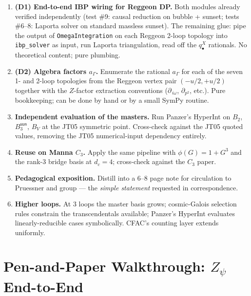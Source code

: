 \documentclass[11pt,a4paper]{article}
\theoremstyle{definition}
\theoremstyle{plain}
\begin{document}
\begin{enumerate}[leftmargin=2em]
  \item \textbf{(D1) End-to-end IBP wiring for Reggeon DP.}  Both
    modules already verified independently (test \#9: causal
    reduction on bubble + sunset; tests \#6--8: Laporta solver on
    standard massless sunset).  The remaining glue: pipe the output
    of \texttt{OmegaIntegration} on each Reggeon 2-loop topology into
    \texttt{ibp\_solver} as input, run Laporta triangulation, read
    off the $q^X_\bullet$ rationals.  No theoretical content; pure
    plumbing.
  \item \textbf{(D2) Algebra factors $a_\Gamma$.}  Enumerate the
    rational $a_\Gamma$ for each of the seven 1- and 2-loop
    topologies from the Reggeon vertex pair $(-u/2, +u/2)$ together
    with the $Z$-factor extraction conventions
    ($\partial_{\,i\omega}$, $\partial_{p^2}$, etc.).  Pure
    bookkeeping; can be done by hand or by a small SymPy routine.
  \item \textbf{Independent evaluation of the masters.}  Run
    Panzer's HyperInt on $B_2$, $B_3^{\textsf{sun}}$, $B_V$ at the
    JT05 symmetric point.  Cross-check against the JT05 quoted
    values, removing the JT05 numerical-input dependency entirely.
  \item \textbf{Reuse on Manna $C_3$.}  Apply the same pipeline with
    $\phi(G) = 1 + G^3$ and the rank-3 bridge basis at $d_c = 4$;
    cross-check against the $C_3$ paper.
  \item \textbf{Pedagogical exposition.}  Distill
     into a 6--8 page note
    for circulation to Pruessner and group --- the \emph{simple
    statement} requested in correspondence.
  \item \textbf{Higher loops.}  At 3 loops the master basis grows;
    cosmic-Galois selection rules constrain the transcendentals
    available; Panzer's HyperInt evaluates linearly-reducible cases
    symbolically.  CFAC's counting layer extends uniformly.
\end{enumerate}

\appendix
\section{Pen-and-Paper Walkthrough: $Z_\psi$ End-to-End}
\label{app:walkthrough}
\end{document}
